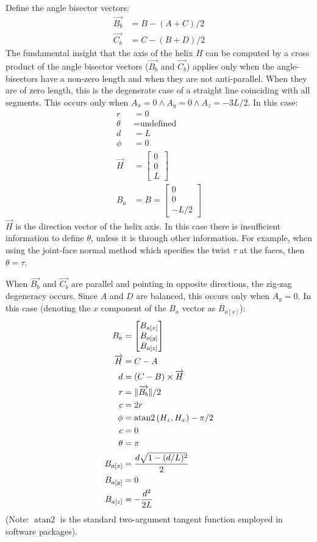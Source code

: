 \documentclass[11pt]{article}
\DeclarePairedDelimiter{\norm}{\lVert}{\rVert}
\DeclareMathOperator{\atantwo}{atan2}
\begin{document}
{Define the angle bisector vectors:
\begin{align}
  \overrightarrow{B_b} &= B - (A + C)/2 \\
  \overrightarrow{C_b} &= C - (B + D)/2
  \end{align}
The fundamental insight that the axis of the helix $H$ can be
computed by a cross product of the angle bisector
vectors ($\overrightarrow{B_b}$ and $\overrightarrow{C_b}$) applies only
when the angle-bisectors have a non-zero length and when
they are not anti-parallel. When they are of zero length, this is
the degenerate case of a straight line coinciding with all segments.
This occurs only when $A_x = 0 \wedge A_y = 0 \wedge A_z = -3L/2$.
In this case:
\begin{align}
  r &= 0 \\
  \theta &= \text{undefined}\\
  d &= L \\
  \phi &= 0 \\
  \overrightarrow{H} &=  \begin{bmatrix} 0 \\ 0 \\ L  \end{bmatrix} \\
  B_a &= B = \begin{bmatrix} 0 \\ 0 \\ -L/2  \end{bmatrix}
\end{align}
$\overrightarrow{H}$ is the direction vector of the helix axis.
In this case there is insufficient information to define $\theta$,
unless it is through other information. For example, when using
the joint-face normal method which specifies
the twist $\tau$ at the faces, then $\theta = \tau$.

When $\overrightarrow{B_b}$ and $\overrightarrow{C_b}$ are parallel and pointing in opposite directions,
the zig-zag degeneracy occurs. Since
$A$ and $D$ are balanced, this occurs only when $A_y = 0$.
In this case (denoting the $x$ component of the $B_a$ vector as $B_{a[x]}$):
\begin{align}
  B_{a} &= \begin{bmatrix} B_{a[x]} \\ B_{a[y]} \\ B_{a[z]}  \end{bmatrix} \\
  \overrightarrow{H} &=  C - A \\
  d &= (C - B) \times \overrightarrow{H} \\
  r &= \norm{\overrightarrow{B_b}} / 2 \\
  c &= 2 r\\
  \phi &= \atantwo{(H_z,H_x)} - \pi/2 \\
  c &= 0 \\
  \theta &= \pi \\
  B_{a[x]} &= \frac{d\sqrt{1 - (d/L)^2}}{2} \\
  B_{a[y]} &= 0 \\
  B_{a[z]} &= -\frac{d^2}{2L}
\end{align}
(Note: $\atantwo$ is the standard two-argument tangent function employed in software packages).

}
\end{document}
